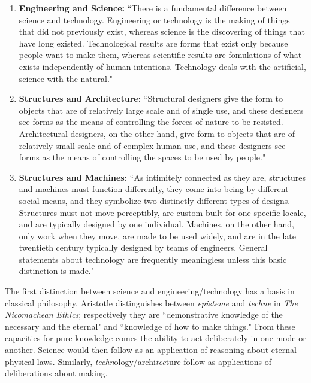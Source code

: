 \begin{enumerate}
  \item [] \textbf{Engineering and Science:} ``There is a fundamental difference between science and technology. Engineering or technology is the making of things that did not previously exist, whereas science is the discovering of things that have long existed. Technological results are forms that exist only because people want to make them, whereas scientific results are fomulations of what exists independently of human intentions. Technology deals with the artificial, science with the natural."\cite[p9]{TOWERANDBRIDGE}

  \item [] \textbf{Structures and Architecture:} ``Structural designers give the form to objects that are of relatively large scale and of single use, and these designers see forms as the means of controlling the forces of nature to be resisted. Architectural designers, on the other hand, give form to objects that are of relatively small scale and of complex human use, and these designers see forms as the means of controlling the spaces to be used by people." \cite[14]{TOWERANDBRIDGE}

  \item[] \textbf{Structures and Machines:} ``As intimitely connected as they are, structures and machines must function differently, they come into being by different social means, and they symbolize two distinctly different types of designs. Structures must not move perceptibly, are custom-built for one specific locale, and are typically designed by one individual. Machines, on the other hand, only work when they move, are made to be used widely, and are in the late twentieth century typically designed by teams of engineers. General statements about technology are frequently meaningless unless this basic distinction is made."\cite[p13]{TOWERANDBRIDGE}

\end{enumerate}

The first distinction between science and engineering/technology has a basis in classical philosophy. Aristotle distinguishes between \textit{episteme} and \textit{techne} in \textit{The Nicomachean Ethics}; respectively they are ``demonstrative knowledge of the necessary and the eternal" and ``knowledge of how to make things." \cite[p104, 105]{NICOMACHEANETHICS} From these capacities for pure knowledge comes the ability to act deliberately in one mode or another. Science would then follow as an application of reasoning about eternal physical laws. Similarly, \textit{techn}ology/archi\textit{tec}ture follow as applications of deliberations about making.

